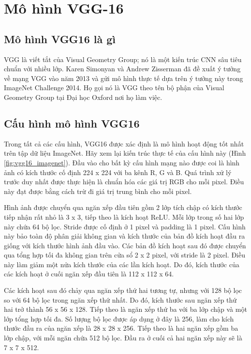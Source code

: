 \section{Mô hình VGG-16}
\subsection{Mô hình VGG16 là gì}
VGG là viết tắt của Visual Geometry Group; nó là một kiến trúc CNN sâu tiêu chuẩn với nhiều lớp. Karen Simonyan và Andrew Zisserman \cite{vgg16} đã đề xuất ý tưởng về mạng VGG vào năm 2013 và gửi mô hình thực tế dựa trên ý tưởng này trong ImageNet Challenge 2014. Họ gọi nó là VGG theo tên bộ phận của Visual Geometry Group tại Đại học Oxford nơi họ làm việc.

\subsection{Cấu hình mô hình VGG16}
Trong tất cả các cấu hình, VGG16 được xác định là mô hình hoạt động tốt nhất trên tập dữ liệu ImageNet. Hãy xem lại kiến trúc thực tế của cấu hình này (Hình \ref{fig:vgg16_imagenet}).
Đầu vào cho bất kỳ cấu hình mạng nào được coi là hình ảnh có kích thước cố định 224 x 224 với ba kênh R, G và B. Quá trình xử lý trước duy nhất được thực hiện là chuẩn hóa các giá trị RGB cho mỗi pixel. Điều này đạt được bằng cách trừ đi giá trị trung bình cho mỗi pixel.

Hình ảnh được chuyển qua ngăn xếp đầu tiên gồm 2 lớp tích chập có kích thước tiếp nhận rất nhỏ là 3 x 3, tiếp theo là kích hoạt ReLU. Mỗi lớp trong số hai lớp này chứa 64 bộ lọc. Stride được cố định ở 1 pixel và padding là 1 pixel. Cấu hình này bảo toàn độ phân giải không gian và kích thước của bản đồ kích hoạt đầu ra giống với kích thước hình ảnh đầu vào. Các bản đồ kích hoạt sau đó được chuyển qua tổng hợp tối đa không gian trên cửa sổ 2 x 2 pixel, với stride là 2 pixel. Điều này làm giảm một nửa kích thước của các lần kích hoạt. Do đó, kích thước của các kích hoạt ở cuối ngăn xếp đầu tiên là 112 x 112 x 64.

Các kích hoạt sau đó chảy qua ngăn xếp thứ hai tương tự, nhưng với 128 bộ lọc so với 64 bộ lọc trong ngăn xếp thứ nhất. Do đó, kích thước sau ngăn xếp thứ hai trở thành 56 x 56 x 128. Tiếp theo là ngăn xếp thứ ba với ba lớp chập và một lớp tổng hợp tối đa. Số lượng bộ lọc được áp dụng ở đây là 256, làm cho kích thước đầu ra của ngăn xếp là 28 x 28 x 256. Tiếp theo là hai ngăn xếp gồm ba lớp chập, với mỗi ngăn chứa 512 bộ lọc. Đầu ra ở cuối cả hai ngăn xếp này sẽ là 7 x 7 x 512.


